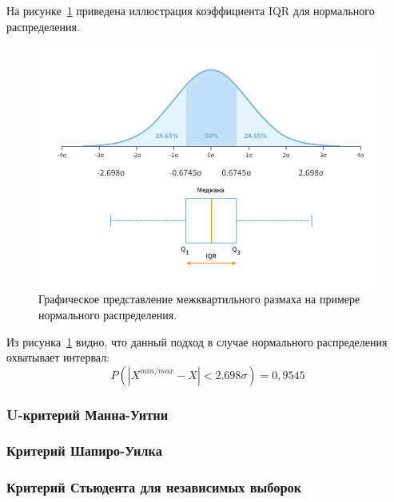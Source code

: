 На рисунке~\ref{fig:ris6} приведена иллюстрация коэффициента IQR для нормального распределения.

\begin{figure}[H]
	\centering
	\includegraphics[width=1\linewidth]{pics/ris6} %
	\caption{Графическое представление межквартильного размаха на примере нормального распределения.}
	\label{fig:ris6} %
\end{figure}

Из рисунка~\ref{fig:ris6} видно, что данный подход в случае нормального распределения охватывает интервал:
\begin{equation} \label{eq:IQRP}
	P(|X^{min/max} - X| < 2.698\sigma)  = 0,9545
\end{equation}



\subsubsection{U-критерий Манна-Уитни}

\subsubsection{Критерий Шапиро-Уилка}

\subsubsection{Критерий Стьюдента для независимых выборок}


